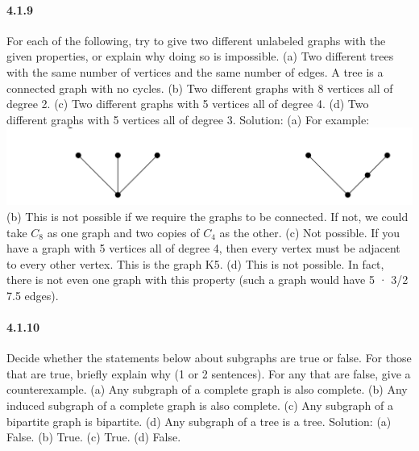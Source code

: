 \documentclass{article}
\begin{document}
\paragraph{4.1.9}
For each of the following, try to give two different unlabeled graphs
with the given properties, or explain why doing so is impossible.\newline
(a) Two different trees with the same number of vertices and the
same number of edges. A tree is a connected graph with no
cycles.\newline
(b) Two different graphs with 8 vertices all of degree 2.\newline
(c) Two different graphs with 5 vertices all of degree 4.\newline
(d) Two different graphs with 5 vertices all of degree 3.\newline
Solution:\newline
(a) For example:\newline
\includegraphics{0053}\newline
(b) This is not possible if we require the graphs to be connected. If not,
we could take $C_8$ as one graph and two copies of $C_4$ as the other.\newline
(c) Not possible. If you have a graph with 5 vertices all of degree 4, then
every vertex must be adjacent to every other vertex. This is the graph
K5.\newline
(d) This is not possible. In fact, there is not even one graph with this
property (such a graph would have 5 · 3/2  7.5 edges).\newline
\paragraph{4.1.10}
Decide whether the statements below about subgraphs are true or
false. For those that are true, briefly explain why (1 or 2 sentences).
For any that are false, give a counterexample.\newline
(a) Any subgraph of a complete graph is also complete.\newline
(b) Any induced subgraph of a complete graph is also complete.\newline
(c) Any subgraph of a bipartite graph is bipartite.\newline
(d) Any subgraph of a tree is a tree.\newline
Solution:\newline
(a) False. (b) True. (c) True. (d) False.
\end{document}
